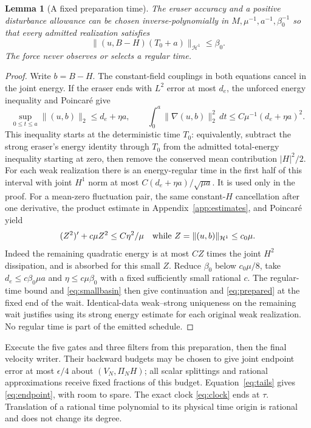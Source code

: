 \documentclass[11pt,a4paper]{amsart}
\newtheorem{lemma}[theorem]{Lemma}
\theoremstyle{definition}
\theoremstyle{remark}
\numberwithin{equation}{section}
\newcommand{\Hcal}{\mathcal H}
\newcommand{\norm}[1]{\lVert #1\rVert}
\begin{document}
\begin{lemma}[A fixed preparation time]\label{lem:prepare}
The eraser accuracy and a positive disturbance allowance can be chosen
inverse-polynomially in $M,\mu^{-1},a^{-1},\beta_0^{-1}$ so that every
admitted realization satisfies
\begin{equation}\label{eq:prepared}
 \norm{(u,B-H)(T_0+a)}_{\Hcal^1}\le\beta_0.
\end{equation}
The force never observes or selects a regular time.
\end{lemma}
\begin{proof}
Write $b=B-H$. The constant-field couplings in both equations cancel in
the joint energy. If the eraser ends with $L^2$ error at most $d_e$, the
unforced energy inequality and Poincar\'e give
\[
 \sup_{0\le t\le a}\norm{(u,b)}_2\le d_e+\eta a,
 \qquad\int_0^a\norm{\nabla(u,b)}_2^2\,dt
       \le C\mu^{-1}(d_e+\eta a)^2.
\]
This inequality starts at the deterministic time $T_0$: equivalently,
subtract the strong eraser's energy identity through $T_0$ from the
admitted total-energy inequality starting at zero, then remove the
conserved mean contribution $|H|^2/2$.
For each weak realization there is an energy-regular time in the first
half of this interval with joint $H^1$ norm at most
$C(d_e+\eta a)/\sqrt{\mu a}$. It is used only in the proof.
For a mean-zero fluctuation pair, the same constant-$H$ cancellation after
one derivative, the product estimate in Appendix~\ref{app:estimates}, and
Poincar\'e yield
\begin{equation}\label{eq:smallbasin}
 (Z^2)'+c\mu Z^2\le C\eta^2/\mu
 \quad\hbox{while }Z=\norm{(u,b)}_{\Hcal^1}\le c_0\mu.
\end{equation}
Indeed the remaining quadratic energy is at most $CZ$ times the joint
$H^2$ dissipation, and is absorbed for this small $Z$. Reduce $\beta_0$
below $c_0\mu/8$, take $d_e\le c\beta_0\mu a$ and
$\eta\le c\mu\beta_0$ with a fixed sufficiently small rational $c$.
The regular-time bound and \eqref{eq:smallbasin} then give continuation
and \eqref{eq:prepared} at the fixed end of the wait. Identical-data
weak--strong uniqueness on the remaining wait justifies using its strong
energy estimate for each original weak realization. No regular time is
part of the emitted schedule.
\end{proof}

Execute the five gates and three filters from this preparation, then the
final velocity writer. Their backward budgets may be chosen to give
joint endpoint error at most $\epsilon/4$ about $(V_N,\Pi_NH)$; all scalar
splittings and rational approximations receive fixed fractions of this
budget. Equation~\eqref{eq:tails} gives \eqref{eq:endpoint}, with room to
spare. The exact clock \eqref{eq:clock} ends at $\tau$. Translation of a
rational time polynomial to its physical time origin is rational and
does not change its degree.
\end{document}
